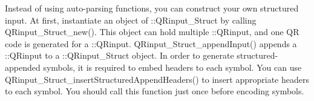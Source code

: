 Instead of using auto-\/parsing functions, you can construct your own structured input. At first, instantiate an object of \+::\+Q\+Rinput\+\_\+\+Struct by calling Q\+Rinput\+\_\+\+Struct\+\_\+new(). This object can hold multiple \+::\+Q\+Rinput, and one QR code is generated for a \+::\+Q\+Rinput. Q\+Rinput\+\_\+\+Struct\+\_\+append\+Input() appends a \+::\+Q\+Rinput to a \+::\+Q\+Rinput\+\_\+\+Struct object. In order to generate structured-\/appended symbols, it is required to embed headers to each symbol. You can use Q\+Rinput\+\_\+\+Struct\+\_\+insert\+Structured\+Append\+Headers() to insert appropriate headers to each symbol. You should call this function just once before encoding symbols. 